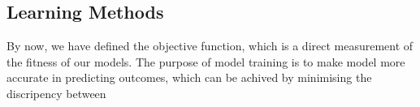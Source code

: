 \subsection {Learning Methods}
By now, we have defined the objective function, which is a direct measurement of the fitness of our models. The purpose of model training is to make model more accurate in predicting outcomes, which can be achived by minimising the discripency between 